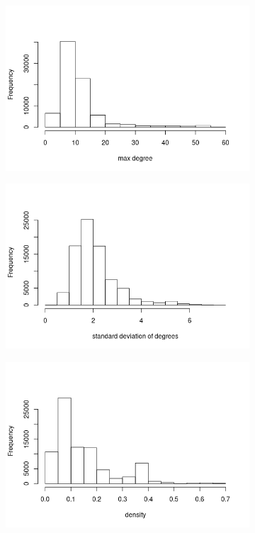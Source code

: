 \documentclass{l4proj}
\theoremstyle{definition}
\theoremstyle{remark}
\begin{document}
\begin{appendices}
\begin{figure}
\begin{subfigure}[t]{0.49\textwidth}
    \end{subfigure}
    \begin{subfigure}[t]{0.49\textwidth}
      \centering
      \includegraphics[width=\textwidth]{images/mcs_maxdeg.png}
    \end{subfigure}
    \begin{subfigure}[t]{0.49\textwidth}
      \centering
      \includegraphics[width=\textwidth]{images/mcs_stddeg.png}
    \end{subfigure}
    \begin{subfigure}[t]{0.49\textwidth}
      \centering
      \includegraphics[width=\textwidth]{images/mcs_density.png}

\end{subfigure}
\end{figure}
\end{appendices}
\end{document}
